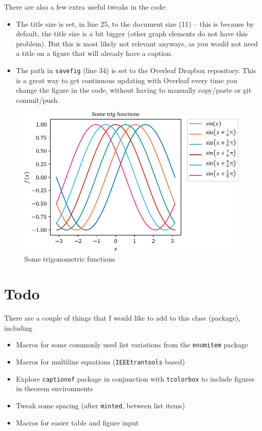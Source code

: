 \documentclass[letterpaper,11pt]{notes}
\theoremstyle{definition}
\theoremstyle{plain}
\theoremstyle{remark}
\begin{document}
There are also a few extra useful tweaks in the code:
\begin{itemize}
    \item The title size is set, in line 25, to the document size (11) -- this is because by default, the title size is a bit bigger (other graph elements do not have this problem). But this is most likely not relevant anyways, as you would not need a title on a figure that will already have a caption.
    \item The path in \texttt{savefig} (line 34) is set to the Overleaf Dropbox repository. This is a great way to get continuous updating with Overleaf every time you change the figure in the code, without having to manually copy/paste or git commit/push.
\end{itemize}

\begin{figure}
    \centering
    \includegraphics{trig.pdf}
    \caption{Some trigonometric functions}
    \label{fig:trig}
\end{figure}

\section{Todo}
There are a couple of things that I would like to add to this class (package), including
\begin{itemize}
    \item Macros for some commonly used list variations from the \texttt{enumitem} package
    \item Macros for multiline equations (\texttt{IEEEtrantools} based)
    \item Explore \texttt{captionof} package in conjunction with \texttt{tcolorbox} to include figures in theorem environments
    \item Tweak some spacing (after \texttt{minted}, between list items)
    \item Macros for easier table and figure input
\end{itemize}
\end{document}
